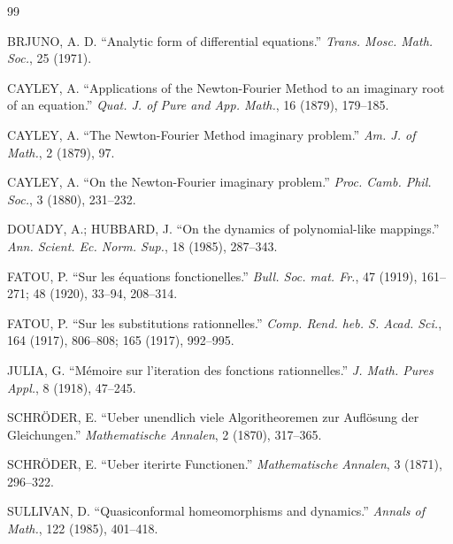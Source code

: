 \documentclass[12pt, a4paper]{article}
\begin{document}
\begin{thebibliography}{99}

 BRJUNO, A. D. ``Analytic form of differential equations.''
\emph{Trans. Mosc. Math. Soc.}, 25 (1971).

 CAYLEY, A. ``Applications of the Newton-Fourier Method to an
imaginary root of an equation.'' \emph{Quat. J. of Pure and App. Math.}, 16
(1879), 179--185.

 CAYLEY, A. ``The Newton-Fourier Method imaginary problem.''
\emph{Am. J. of Math.}, 2 (1879), 97.

 CAYLEY, A. ``On the Newton-Fourier imaginary problem.'' \emph{Proc.
Camb. Phil. Soc.}, 3 (1880), 231--232.

 DOUADY, A.; HUBBARD, J. ``On the dynamics of polynomial-like
mappings.'' \emph{Ann. Scient. Ec. Norm. Sup.}, 18 (1985), 287--343.

 FATOU, P. ``Sur les équations fonctionelles.'' \emph{Bull. Soc. mat.
Fr.}, 47 (1919), 161--271; 48 (1920), 33--94, 208--314.

 FATOU, P. ``Sur les substitutions rationnelles.'' \emph{Comp. Rend.
heb. S. Acad. Sci.}, 164 (1917), 806--808; 165 (1917), 992--995.

 JULIA, G. ``Mémoire sur l'iteration des fonctions rationnelles.''
\emph{J. Math. Pures Appl.}, 8 (1918), 47--245.

 SCHRÖDER, E. ``Ueber unendlich viele Algoritheoremen zur Auflösung der
Gleichungen.'' \emph{Mathematische Annalen}, 2 (1870), 317--365.

 SCHRÖDER, E. ``Ueber iterirte Functionen.'' \emph{Mathematische
Annalen}, 3 (1871), 296--322.

 SULLIVAN, D. ``Quasiconformal homeomorphisms and dynamics.''
\emph{Annals of Math.}, 122 (1985), 401--418.

\end{thebibliography}
\end{document}

